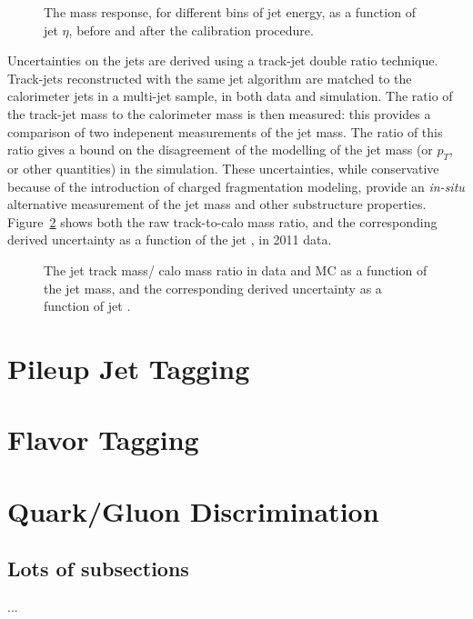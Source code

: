 \begin{figure}
\centering
{}
\label{fig:jet-reconstruction:total_jms}
\caption{The mass response, for different bins of jet energy, as a function of jet $\eta$, before and after the calibration procedure.}
\end{figure}

Uncertainties on the \largeR jets are derived using a track-jet double ratio technique. Track-jets reconstructed with the same jet algorithm are matched to the calorimeter jets in a multi-jet sample, in both data and simulation. The ratio of the track-jet mass to the calorimeter mass is then measured: this provides a comparison of two indepenent measurements of the jet mass. The ratio of this ratio gives a bound on the disagreement of the modelling of the jet mass (or $p_T$, or other quantities) in the simulation.  These uncertainties, while conservative because of the introduction of charged fragmentation modeling, provide an \textit{in-situ} alternative measurement of the jet mass and other substructure properties. Figure~\ref{fig:jet-reconstruction:jms_uncertainty} shows both the raw track-to-calo mass ratio, and the corresponding derived uncertainty as a function of the jet \pt, in 2011 data.

\begin{figure}
\centering
{}
\label{fig:jet-reconstruction:jms_uncertainty}
\caption{The jet track mass/ calo mass ratio in data and MC as a function of the jet mass, and the corresponding derived uncertainty as a function of jet \pt.}
\end{figure}


\section{Pileup Jet Tagging}
\label{jet-reconstruction:pileup-jet-tagging}

\section{Flavor Tagging}

\section{Quark/Gluon Discrimination}
	\subsection{Lots of subsections}
		...